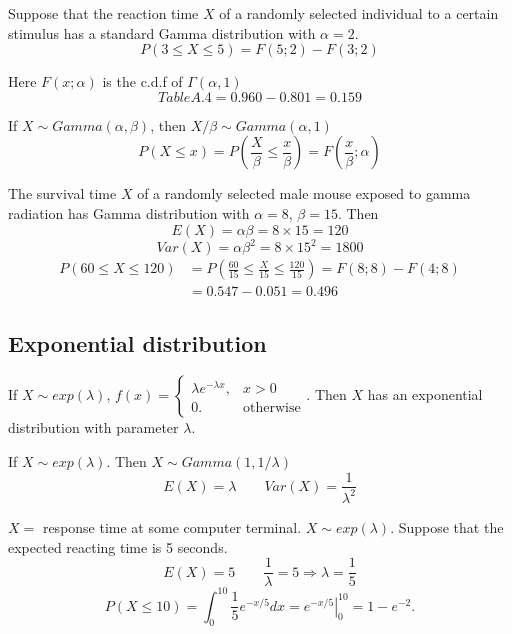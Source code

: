\begin{exmp}
Suppose that the reaction time $X$ of a randomly selected individual to a certain stimulus has a standard Gamma distribution with $\alpha=2$.
\[P(3 \leq X \leq 5)=F(5;2)-F(3;2)\]

Here $F(x;\alpha)$ is the c.d.f of $\Gamma(\alpha,1)$
\[Table A.4=0.960-0.801=0.159\]
\end{exmp}

\begin{prop}
If $X\sim Gamma(\alpha,\beta)$, then $X/\beta \sim Gamma(\alpha,1)$
\[P(X\leq x)=P\left(\frac{X}{\beta} \leq \frac{x}{\beta}\right)=F\left(\frac{x}{\beta};\alpha \right)\]
\end{prop}

\begin{exmp}
The survival time $X$ of a randomly selected male mouse exposed to gamma radiation has Gamma distribution with $\alpha=8$, $\beta=15$. Then
\[E(X)=\alpha\beta =8 \times 15 =120\]
\[Var(X)=\alpha \beta^2 =8 \times 15^2 =1800\]
\begin{align*}
P(60 \leq X \leq 120)&=P\left(\frac{60}{15}\leq\frac{X}{15} \leq\frac{120}{15} \right)=F(8;8)-F(4;8) \\
&=0.547-0.051=0.496
\end{align*}
\end{exmp}

\subsection{Exponential distribution}
If $X\sim exp(\lambda)$,
$f(x)=\begin{cases}
\lambda e^{-\lambda x}, 	& x >0\\
0. &\text{otherwise}
\end{cases}$. Then $X$ has an exponential distribution with parameter $\lambda$.

\begin{prop}
If $X\sim exp(\lambda)$. Then $X \sim Gamma(1,1/\lambda)$
\[E(X)=\lambda \qquad Var(X)=\frac{1}{\lambda^2}\]
\end{prop}

\begin{exmp}
$X = $ response time at some computer terminal. $X \sim exp(\lambda)$. Suppose that the expected reacting time is 5 seconds.
\[E(X)=5 \qquad \frac{1}{\lambda}=5 \Rightarrow \lambda=\frac{1}{5}\]
\[P(X\leq 10)=\int_0^{10} \frac{1}{5} e^{-x/5} dx=\left. e^{-x/5}\right|_{0}^{10}=1-e^{-2}. \]
\end{exmp}

